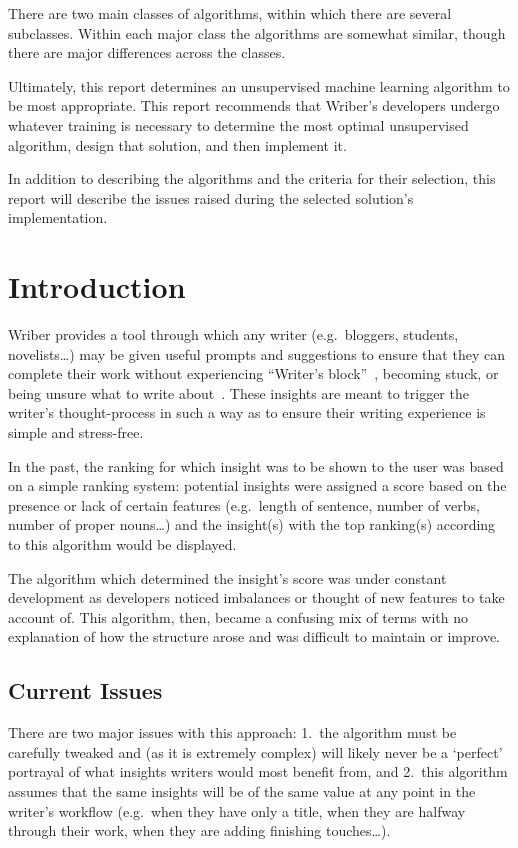 \documentclass[12pt]{article}
\begin{document}
There are two main classes of algorithms, within which there are several subclasses. Within each major class the algorithms are somewhat similar, though there are major differences across the classes.

Ultimately, this report determines an unsupervised machine learning algorithm to be most appropriate. This report recommends that Wriber's developers undergo whatever training is necessary to determine the most optimal unsupervised algorithm, design that solution, and then implement it.

In addition to describing the algorithms and the criteria for their selection, this report will describe the issues raised during the selected solution's implementation.
\newpage


\toc
\lot


\section{Introduction}
Wriber provides a tool through which any writer (e.g.\ bloggers, students, novelists\dots) may be given useful prompts and suggestions to ensure that they can complete their work without experiencing ``Writer's block''~\cite{kamil}, becoming stuck, or being unsure what to write about~\cite{wriber}. These insights are meant to trigger the writer's thought-process in such a way as to ensure their writing experience is simple and stress-free.

In the past, the ranking for which insight was to be shown to the user was based on a simple ranking system: potential insights were assigned a score based on the presence or lack of certain features (e.g.\ length of sentence, number of verbs, number of proper nouns\dots) and the insight(s) with the top ranking(s) according to this algorithm would be displayed.

The algorithm which determined the insight's score was under constant development as developers noticed imbalances or thought of new features to take account of. This algorithm, then, became a confusing mix of terms with no explanation of how the structure arose and was difficult to maintain or improve.

\subsection{Current Issues}
There are two major issues with this approach: 1.\ the algorithm must be carefully tweaked and (as it is extremely complex) will likely never be a `perfect' portrayal of what insights writers would most benefit from, and 2.\ this algorithm assumes that the same insights will be of the same value at any point in the writer's workflow (e.g.\ when they have only a title, when they are halfway through their work, when they are adding finishing touches\dots).
\end{document}

